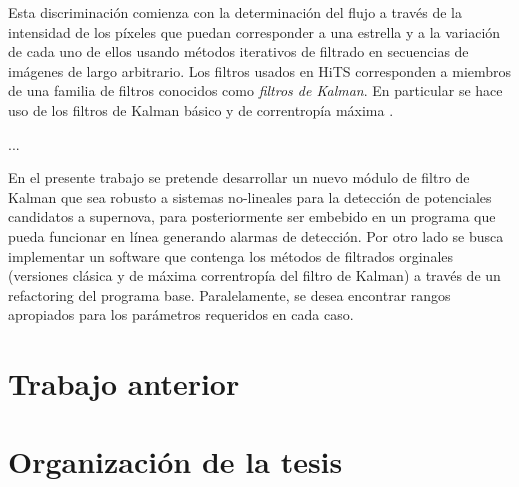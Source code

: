 Esta discriminaci\'on comienza con la determinaci\'on del flujo a trav\'es de la intensidad de los p\'ixeles que puedan corresponder a una estrella y a la variaci\'on de cada uno de ellos usando m\'etodos iterativos de filtrado en secuencias de im\'agenes de largo arbitrario. Los filtros usados en HiTS corresponden a miembros de una familia de filtros conocidos como \textit{filtros de Kalman}. En particular se hace uso de los filtros de Kalman b\'asico \cite{kalman} y de correntrop\'ia m\'axima \cite{chen}.

...


En el presente trabajo se pretende desarrollar un nuevo m\'odulo de filtro de Kalman que sea robusto a sistemas no-lineales para la detecci\'on de potenciales candidatos a supernova, para posteriormente ser embebido en un programa que pueda funcionar en l\'inea generando alarmas de detecci\'on. Por otro lado se busca implementar un software que contenga los m\'etodos de filtrados orginales (versiones cl\'asica y de m\'axima correntrop\'ia del filtro de Kalman) a trav\'es de un refactoring del programa  base. Paralelamente, se desea encontrar rangos apropiados para los par\'ametros requeridos en cada caso.


\section{Trabajo anterior}



\section{Organizaci\'on de la tesis}
\bigskip

